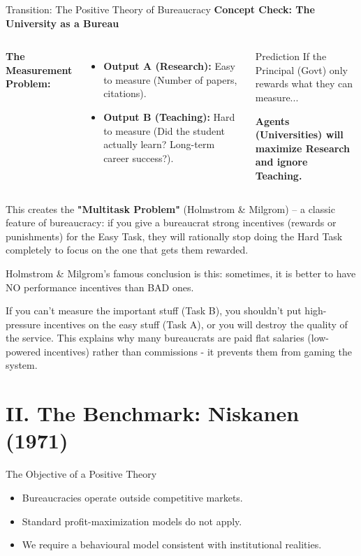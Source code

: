 \documentclass[10pt]{beamer}
\begin{document}
\begin{frame}[allowframebreaks]{Transition: The Positive Theory of Bureaucracy}
\textbf{Concept Check: The University as a Bureau}

\begin{columns}[c]
\textbf{The Measurement Problem:}
\begin{itemize}
\item \textbf{Output A (Research):} Easy to measure (Number of papers, citations).
\item \textbf{Output B (Teaching):} Hard to measure (Did the student actually learn? Long-term career success?).
\end{itemize}

\begin{alertblock}{Prediction}
If the Principal (Govt) only rewards what they can measure...
\vspace{0.2cm}

\textbf{Agents (Universities) will maximize Research and ignore Teaching.}
\end{alertblock}
\end{columns}

\framebreak

 This creates the \textbf{"Multitask Problem"} (Holmstrom \& Milgrom) – a classic feature of bureaucracy: if you give a bureaucrat strong incentives (rewards or punishments) for the Easy Task, they will rationally stop doing the Hard Task completely to focus on the one that gets them rewarded.

 Holmstrom \& Milgrom’s famous conclusion is this: sometimes, it is better to have NO performance incentives than BAD ones.

If you can't measure the important stuff (Task B), you shouldn't put high-pressure incentives on the easy stuff (Task A), or you will destroy the quality of the service. This explains why many bureaucrats are paid flat salaries (low-powered incentives) rather than commissions - it prevents them from gaming the system.
\end{frame}


\section{II. The Benchmark: Niskanen (1971)}

\begin{frame}{The Objective of a Positive Theory}
\begin{itemize}
\item Bureaucracies operate outside competitive markets.
\item Standard profit-maximization models do not apply.
\item We require a behavioural model consistent with institutional realities.
\end{itemize}
\end{frame}
\end{document}
